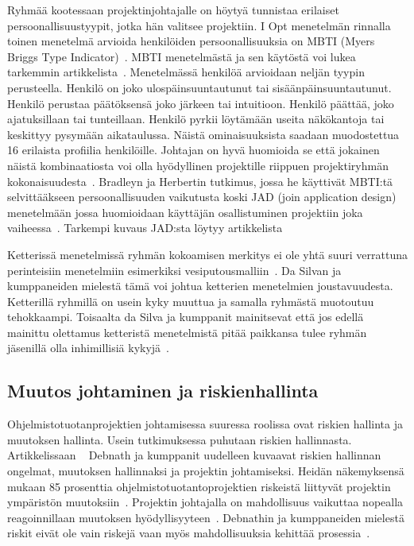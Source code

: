 \documentclass[finnish]{tktltiki2}
\theoremstyle{definition}
\theoremstyle{remark}
\begin{document}
Ryhmää kootessaan projektinjohtajalle on höytyä tunnistaa erilaiset persoonallisuustyypit, jotka hän valitsee projektiin. I Opt menetelmän rinnalla toinen menetelmä arvioida henkilöiden persoonallisuuksia on MBTI (Myers Briggs Type Indicator)~\cite{bradley1997effect}. MBTI menetelmästä ja sen käytöstä voi lukea tarkemmin artikkelista~\cite{myers1985manual}. Menetelmässä henkilöä arvioidaan neljän tyypin perusteella. Henkilö on joko ulospäinsuuntautunut tai sisäänpäinsuuntautunut. Henkilö perustaa päätöksensä joko järkeen tai intuitioon. Henkilö päättää, joko ajatuksillaan tai tunteillaan. Henkilö pyrkii löytämään useita näkökantoja tai keskittyy pysymään aikataulussa. Näistä ominaisuuksista saadaan muodostettua 16 erilaista profiilia henkilöille. Johtajan on hyvä huomioida se että jokainen näistä kombinaatiosta voi olla hyödyllinen projektille riippuen projektiryhmän kokonaisuudesta~\cite{bradley1997effect}. Bradleyn ja Herbertin tutkimus, jossa he käyttivät MBTI:tä selvittääkseen persoonallisuuden vaikutusta koski JAD (join application design) menetelmään jossa huomioidaan käyttäjän osallistuminen projektiin joka vaiheessa~\cite{bradley1997effect}. Tarkempi kuvaus JAD:sta löytyy artikkelista~\cite{Davidson1999215}

Ketterissä menetelmissä ryhmän kokoamisen merkitys ei ole yhtä suuri verrattuna perinteisiin menetelmiin esimerkiksi vesiputousmalliin~\cite{daSilva2012}. Da Silvan ja kumppaneiden mielestä tämä voi johtua ketterien menetelmien joustavuudesta. Ketterillä ryhmillä on usein kyky muuttua ja samalla ryhmästä muotoutuu tehokkaampi. Toisaalta da Silva ja kumppanit mainitsevat että jos edellä mainittu olettamus ketteristä menetelmistä pitää paikkansa tulee ryhmän jäsenillä olla inhimillisiä kykyjä~\cite{daSilva2012}.


\subsection{Muutos johtaminen ja riskienhallinta}

Ohjelmistotuotanprojektien johtamisessa suuressa roolissa ovat riskien hallinta ja muutoksen hallinta. Usein tutkimuksessa puhutaan riskien hallinnasta. Artikkelissaan ~\cite{4017705} Debnath ja kumppanit uudelleen kuvaavat riskien hallinnan ongelmat, muutoksen hallinnaksi ja projektin johtamiseksi. Heidän näkemyksensä mukaan 85 prosenttia ohjelmistotuotantoprojektien riskeistä liittyvät projektin ympäristön muutoksiin~\cite{4017705}. Projektin johtajalla on mahdollisuus vaikuttaa nopealla reagoinnillaan muutoksen hyödyllisyyteen~\cite{4017705}. Debnathin ja kumppaneiden mielestä riskit eivät ole vain riskejä vaan myös mahdollisuuksia kehittää prosessia~\cite{4017705}.
\end{document}
